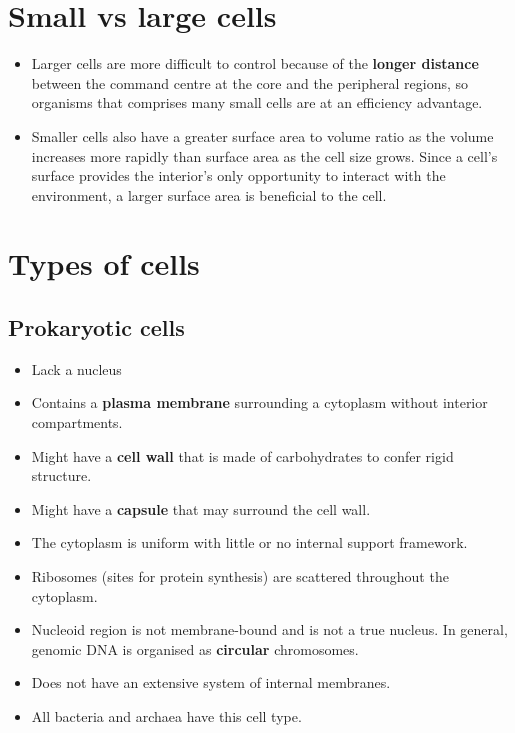 \documentclass[11pt]{article}
\begin{document}
\section{Small vs large cells}
\label{sec:org3a9c10c}
\begin{itemize}
\item Larger cells are more difficult to control because of the \textbf{longer distance} between the command centre at the core and the peripheral regions, so organisms that comprises many small cells are at an efficiency advantage.
\item Smaller cells also have a greater surface area to volume ratio as the volume increases more rapidly than surface area as the cell size grows. Since a cell's surface provides the interior's only opportunity to interact with the environment, a larger surface area is beneficial to the cell.
\end{itemize}

\newpage
\section{Types of cells}
\label{sec:org16e8617}

\subsection{Prokaryotic cells}
\label{sec:org3f347b5}
\begin{itemize}
\item Lack a nucleus
\item Contains a \textbf{plasma membrane} surrounding a cytoplasm without interior compartments.
\item Might have a \textbf{cell wall} that is made of carbohydrates to confer rigid structure.
\item Might have a \textbf{capsule} that may surround the cell wall.
\item The cytoplasm is uniform with little or no internal support framework.
\item Ribosomes (sites for protein synthesis) are scattered throughout the cytoplasm.
\item Nucleoid region is not membrane-bound and is not a true nucleus. In general, genomic DNA is organised as \textbf{circular} chromosomes.
\item Does not have an extensive system of internal membranes.
\item All bacteria and archaea have this cell type.
\end{itemize}
\end{document}
